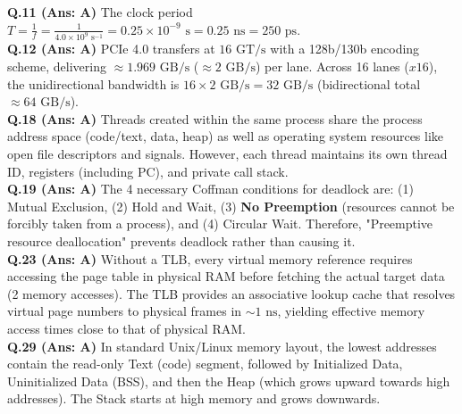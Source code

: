 \begin{solutionbox}
\textbf{Q.11 (Ans: A)} The clock period $T = \frac{1}{f} = \frac{1}{4.0 \times 10^9\text{ s}^{-1}} = 0.25 \times 10^{-9}\text{ s} = 0.25\text{ ns} = 250\text{ ps}$.\\[2mm]
\textbf{Q.12 (Ans: A)} PCIe 4.0 transfers at $16\text{ GT/s}$ with a 128b/130b encoding scheme, delivering $\approx 1.969\text{ GB/s}$ ($\approx 2\text{ GB/s}$) per lane. Across 16 lanes ($x16$), the unidirectional bandwidth is $16 \times 2\text{ GB/s} = 32\text{ GB/s}$ (bidirectional total $\approx 64\text{ GB/s}$).\\[2mm]
\textbf{Q.18 (Ans: A)} Threads created within the same process share the process address space (code/text, data, heap) as well as operating system resources like open file descriptors and signals. However, each thread maintains its own thread ID, registers (including PC), and private call stack.\\[2mm]
\textbf{Q.19 (Ans: A)} The 4 necessary Coffman conditions for deadlock are: (1) Mutual Exclusion, (2) Hold and Wait, (3) \textbf{No Preemption} (resources cannot be forcibly taken from a process), and (4) Circular Wait. Therefore, "Preemptive resource deallocation" prevents deadlock rather than causing it.\\[2mm]
\textbf{Q.23 (Ans: A)} Without a TLB, every virtual memory reference requires accessing the page table in physical RAM before fetching the actual target data (2 memory accesses). The TLB provides an associative lookup cache that resolves virtual page numbers to physical frames in $\sim 1\text{ ns}$, yielding effective memory access times close to that of physical RAM.\\[2mm]
\textbf{Q.29 (Ans: A)} In standard Unix/Linux memory layout, the lowest addresses contain the read-only Text (code) segment, followed by Initialized Data, Uninitialized Data (BSS), and then the Heap (which grows upward towards high addresses). The Stack starts at high memory and grows downwards.
\end{solutionbox}

\newpage
